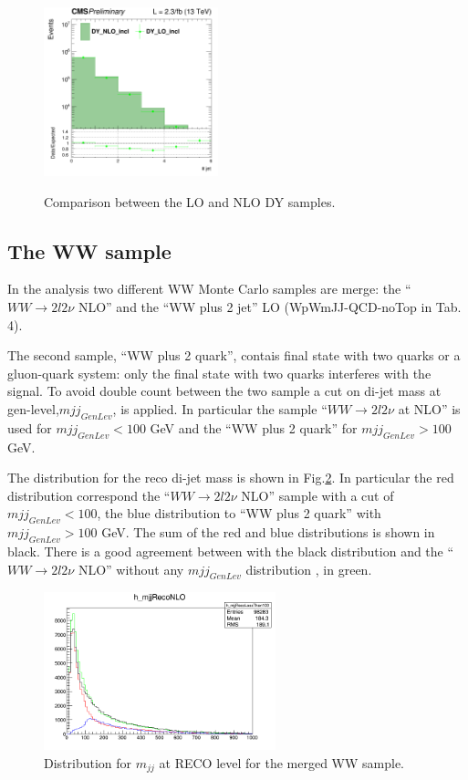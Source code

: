 \begin{figure}[htbp]
{\includegraphics[width=0.45\textwidth]{../AN/Figs/DY/LOvsNLO/log_cratio_dyee_13TeV_njet.png}
}
\caption{
    Comparison between the LO and NLO DY samples.}
    \label{fig:LOvsNLO}
\end{figure}




\subsection{The WW sample}

In the analysis two different WW Monte Carlo samples are merge: the ``$WW \rightarrow 2l 2\nu$ NLO'' and the ``WW plus 2 jet'' LO (WpWmJJ-QCD-noTop in Tab. 4). 

The second sample,  ``WW plus 2 quark'', contais final state with two quarks or a gluon-quark system: only the final state with two quarks interferes with the signal.
To avoid double count between the two sample a cut on di-jet mass at gen-level,$mjj_{GenLev}$, is applied. In particular the sample ``$WW \rightarrow 2l 2\nu$ at NLO'' is used for $mjj_{GenLev} <100$ GeV and the ``WW plus 2 quark'' for $mjj_{GenLev} >100$ GeV.

The  distribution for the reco di-jet mass is shown in Fig.\ref{fig:WW}. In particular the red distribution correspond the ``$WW \rightarrow 2l 2\nu$ NLO'' sample with a cut of  $mjj_{GenLev} <100$, the blue distribution to  ``WW plus 2 quark'' with $mjj_{GenLev} >100$ GeV. The sum of the red and blue distributions is shown in black. There is a good agreement between with the black distribution and the ``$WW \rightarrow 2l 2\nu$ NLO'' without any  $mjj_{GenLev}$ distribution , in green.



\begin{figure}[htbp]
\centering
\includegraphics[width=0.6\textwidth]{../AN/Figs/WW_distribution}
\caption{ Distribution for $m_{jj}$ at RECO level for the merged WW sample.}
    \label{fig:WW}
\end{figure}

